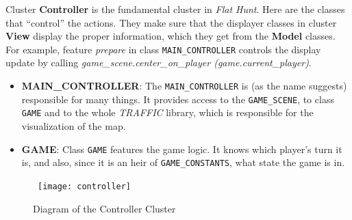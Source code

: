 Cluster \textbf{Controller} is the fundamental cluster in \emph{Flat Hunt}. Here are the classes that ``control'' the actions. They make sure that the displayer classes in cluster \textbf{View} display the proper information, which they get from the \textbf{Model} classes. For example, feature \textit{prepare} in class \texttt{MAIN\_CONTROLLER} controls the display update by calling \textit{game\_scene.center\_on\_player (game.current\_player)}.

\begin{itemize}
  \item{\textbf{MAIN\_CONTROLLER}: The \texttt{MAIN\_CONTROLLER} is (as the name suggests) responsible for many things. It provides access to the \texttt{GAME\_SCENE}, to class \texttt{GAME} and to the whole \emph{TRAFFIC} library, which is responsible for the visualization of the map.}
  \item{\textbf{GAME}: Class \texttt{GAME} features the game logic. It knows which player's turn it is, and also, since it is an heir of \texttt{GAME\_CONSTANTS}, what state the game is in.}
\end{itemize}

\begin{figure}[h]
\centerline{\hbox{  
  \texttt{[image: controller]}
  }}
\caption{Diagram of the Controller Cluster}
\label{controllerdiagram}
\end{figure}
